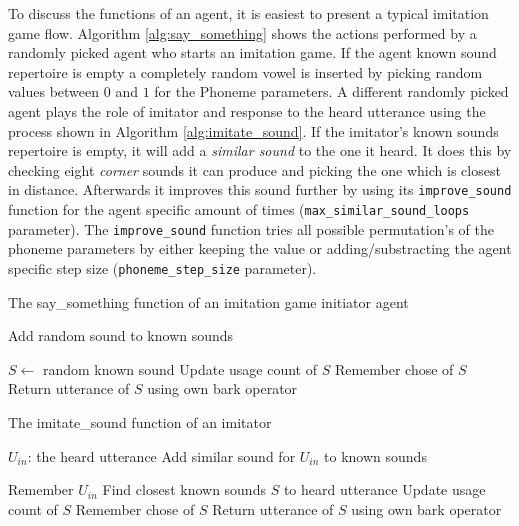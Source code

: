 To discuss the functions of an agent, it is easiest to present a typical imitation game flow.
Algorithm \ref{alg:say_something} shows the actions performed by a randomly picked agent who starts an imitation game.
If the agent known sound repertoire is empty a completely random vowel is inserted by picking random values between $0$ and $1$ for the Phoneme parameters.
A different randomly picked agent plays the role of imitator and response to the heard utterance using the process shown in Algorithm \ref{alg:imitate_sound}.
If the imitator's known sounds repertoire is empty, it will add a \textit{similar sound} to the one it heard.
It does this by checking eight \textit{corner} sounds it can produce and picking the one which is closest in distance.
Afterwards it improves this sound further by using its \texttt{improve\_sound} function for the agent specific amount of times (\texttt{max\_similar\_sound\_loops} parameter).
The \texttt{improve\_sound} function tries all possible permutation's of the phoneme parameters by either keeping the value or adding/substracting the agent specific step size (\texttt{phoneme\_step\_size} parameter).


\begin{algorithm}[hbt!]
\caption{The say\_something function of an imitation game initiator agent}\label{alg:say_something}
\begin{algorithmic}
    \State Add random sound to known sounds
\EndIf

\State $S \gets$ random known sound
\State Update usage count of $S$
\State Remember chose of $S$
\State Return utterance of $S$ using own bark operator


\end{algorithmic}
\end{algorithm}


\begin{algorithm}[hbt!]
\caption{The imitate\_sound function of an imitator}\label{alg:imitate_sound}
\begin{algorithmic}
\Require $U_{in}$: the heard utterance
    \State Add similar sound for $U_{in}$ to known sounds
\EndIf

\State Remember $U_{in}$
\State Find closest known sounds $S$ to heard utterance
\State Update usage count of $S$
\State Remember chose of $S$
\State Return utterance of $S$ using own bark operator


\end{algorithmic}
\end{algorithm}


